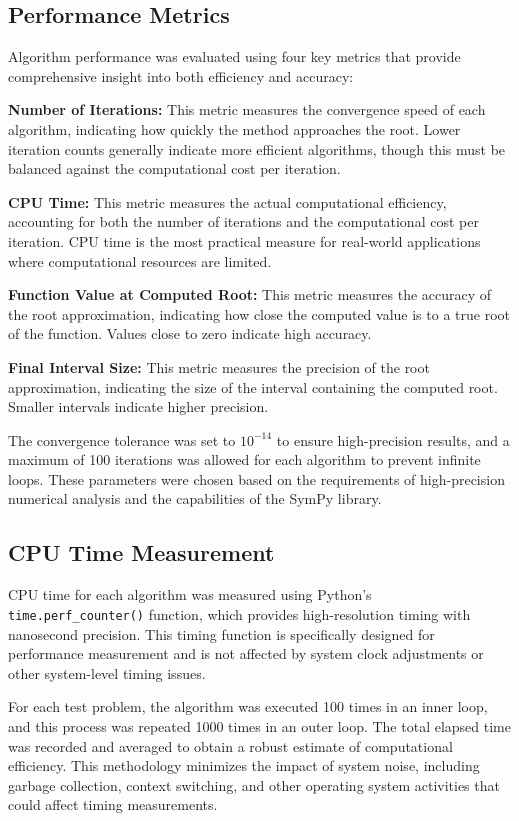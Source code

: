 \documentclass[amsmath, amssymb, aps]{revtex4-2}
\begin{document}
\subsection{Performance Metrics}

Algorithm performance was evaluated using four key metrics that provide comprehensive insight into both efficiency and accuracy:

\textbf{Number of Iterations:} This metric measures the convergence speed of each algorithm, indicating how quickly the method approaches the root. Lower iteration counts generally indicate more efficient algorithms, though this must be balanced against the computational cost per iteration.

\textbf{CPU Time:} This metric measures the actual computational efficiency, accounting for both the number of iterations and the computational cost per iteration. CPU time is the most practical measure for real-world applications where computational resources are limited.

\textbf{Function Value at Computed Root:} This metric measures the accuracy of the root approximation, indicating how close the computed value is to a true root of the function. Values close to zero indicate high accuracy.

\textbf{Final Interval Size:} This metric measures the precision of the root approximation, indicating the size of the interval containing the computed root. Smaller intervals indicate higher precision.

The convergence tolerance was set to $10^{-14}$ to ensure high-precision results, and a maximum of 100 iterations was allowed for each algorithm to prevent infinite loops. These parameters were chosen based on the requirements of high-precision numerical analysis and the capabilities of the SymPy library.

\subsection{CPU Time Measurement}

CPU time for each algorithm was measured using Python's \texttt{time.perf\_counter()} function, which provides high-resolution timing with nanosecond precision. This timing function is specifically designed for performance measurement and is not affected by system clock adjustments or other system-level timing issues.

For each test problem, the algorithm was executed 100 times in an inner loop, and this process was repeated 1000 times in an outer loop. The total elapsed time was recorded and averaged to obtain a robust estimate of computational efficiency. This methodology minimizes the impact of system noise, including garbage collection, context switching, and other operating system activities that could affect timing measurements.
\end{document}
